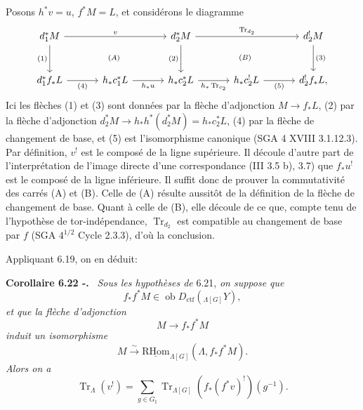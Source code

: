 \documentclass[11pt]{article}
\newenvironment{statement}[1]{\par\medskip\noindent\textbf{#1.}\ }{\par\medskip}
\newcommand{\R}{\mathrm{R}}\newcommand{\RHomCore}{\mathrm{RHom}}
\providecommand{\RHom}{\RHomCore}
\providecommand{\uRHom}{\underline{\RHom}}
\providecommand{\Tr}{\operatorname{Tr}}
\providecommand{\Tr}{\operatorname{Tr}}
\providecommand{\Ob}{\operatorname{ob}}
\providecommand{\Tr}{\operatorname{Tr}}
\providecommand{\RHom}{\RHomCore}
\providecommand{\RHom}{\R\mathcal{H}om}
\providecommand{\Ob}{\operatorname{ob}}
\providecommand{\R}{\mathrm R}
\providecommand{\Tr}{\operatorname{Tr}}
\providecommand{\Ob}{\operatorname{Ob}}
\providecommand{\RHom}{\RHomCore}
\providecommand{\Tr}{\operatorname{Tr}}
\providecommand{\Ob}{\operatorname{ob}}
\providecommand{\Ob}{\operatorname{Ob}}
\begin{document}
Posons $h^*v=u$, $f^*M=L$, et considérons le diagramme
\[
\begin{tikzcd}[column sep=3.2em,row sep=large]
d_1^*M \arrow[rr,"v"] \arrow[d,"{(1)}"'] &&
d_2^*M \arrow[rr,"\Tr_{d_2}"] \arrow[d,"{(2)}"'] &&
d_2^!M \arrow[d,"{(3)}"]\\
d_1^*f_*L \arrow[r,"{(4)}"'] &
h_*c_1^*L \arrow[r,"h_*u"'] &
h_*c_2^*L \arrow[r,"h_*\Tr_{c_2}"'] &
h_*c_2^!L \arrow[r,"{(5)}"'] &
d_2^!f_*L,
\arrow[from=1-1,to=2-3, phantom, "\scriptstyle (A)"]
\arrow[from=1-3,to=2-5, phantom, "\scriptstyle (B)"]
\end{tikzcd}
\]
Ici les flèches (1) et (3) sont données par la flèche d'adjonction $M\to f_*L$, (2) par la flèche d'adjonction $d_2^*M\to h_*h^*(d_2^*M)=h_*c_2^*L$, (4) par la flèche de changement de base, et (5) est l'isomorphisme canonique (SGA 4 XVIII 3.1.12.3). Par définition, $v^!$ est le composé de la ligne supérieure. Il découle d'autre part de l'interprétation de l'image directe d'une correspondance (III 3.5 b), 3.7) que $f_*u^!$ est le composé de la ligne inférieure. Il suffit donc de prouver la commutativité des carrés (A) et (B). Celle de (A) résulte aussitôt de la définition de la flèche de changement de base. Quant à celle de (B), elle découle de ce que, compte tenu de l'hypothèse de tor-indépendance, $\Tr_{d_2}$ est compatible au changement de base par $f$ (SGA $4^{1/2}$ Cycle 2.3.3), d'où la conclusion.

Appliquant 6.19, on en déduit:

\begin{statement}{Corollaire 6.22 -}
\emph{Sous les hypothèses de} 6.21, \emph{on suppose que}
\[
f_*f^*M\in\Ob D_{\mathrm{ctf}}({}_{\Lambda[G]}Y),
\]
\emph{et que la flèche d'adjonction}
\[
M\to f_*f^*M
\]
\emph{induit un isomorphisme}
\[
M\xrightarrow{\sim}\uRHom_{\Lambda[G]}(\Lambda,f_*f^*M).
\]
\emph{Alors on a}
\begin{equation}
\Tr_{\Lambda}(v^!)=
\sum_{g\in G_{\natural}}\Tr_{\Lambda[G]}(f_*(f^*v)^!)(g^{-1}).
\tag{6.22.1}
\end{equation}
\end{statement}
\end{document}
